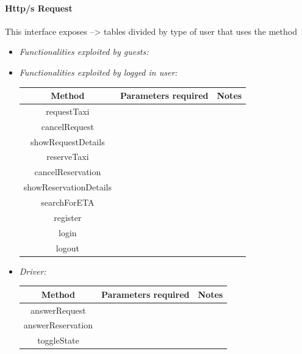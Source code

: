 \documentclass{article}
\begin{document}
\paragraph{Http/s Request}
This interface exposes  %
--> tables divided by type of user that uses the method %
\begin{itemize}
	\item \textit{Functionalities exploited by guests:}	
	
	\item \textit{Functionalities exploited by logged in user:} %
		\begin{tabular}{*{3}{c}}
			\toprule
			Method & Parameters required & Notes \\
			\midrule
			requestTaxi &  & \\ %
			cancelRequest & & \\ %
			showRequestDetails & & \\
			reserveTaxi & &  \\
			cancelReservation & & \\
			showReservationDetails & & \\
			searchForETA & & \\
			register & & \\
			login & & \\
			logout & & \\
			\bottomrule
		\end{tabular}

	\item \textit{Driver:}

				\begin{tabular}{*{3}{c}}
					\toprule
					Method & Parameters required & Notes \\
					\midrule
					answerRequest & & \\ %
					answerReservation & & \\ %
					toggleState & & \\
					\bottomrule
				\end{tabular}

	

\end{itemize}
\end{document}

